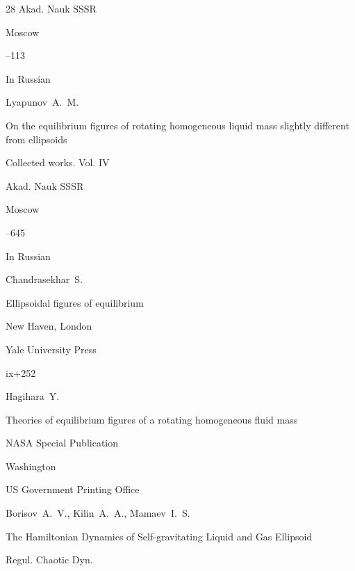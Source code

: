 \begin{thebibliography}{28}
\publ Akad. Nauk SSSR

\publaddr Moscow

--113


\lang In Russian




\by Lyapunov~A.~M.

\paper On the equilibrium figures of rotating homogeneous liquid mass slightly different from ellipsoids

\inbook Collected works. \rm  Vol. IV


\publ Akad. Nauk SSSR

\publaddr Moscow

--645


\lang In Russian




\by Chandrasekhar~S.

\book Ellipsoidal figures of equilibrium


\publaddr New Haven, London

\publ Yale University Press 

\totalpages ix+252 





\by Hagihara~Y.

\book Theories of equilibrium figures of a rotating homogeneous fluid mass


\serial NASA Special Publication 


\publaddr Washington

\publ US Government Printing Office





\by Borisov~A.~V., Kilin~A.~A., Mamaev~I.~S.

\paper The Hamiltonian Dynamics of Self-gravitating Liquid and Gas Ellipsoid

\jour Regul. Chaotic Dyn. 


\end{thebibliography}
